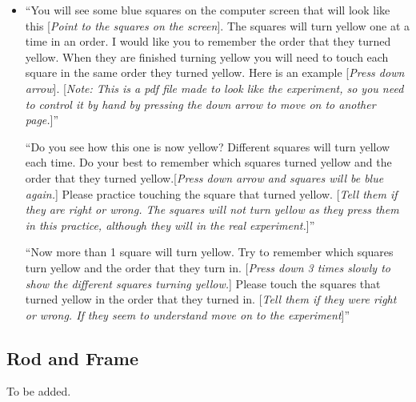 \documentclass{article}
\begin{document}
\begin{itemize}

\item ``You will see some blue squares on the computer screen that will look like this [\emph{Point to the squares on the screen}].  The squares will turn yellow one at a time in an order. I would like you to remember the order that they turned yellow. When they are finished turning yellow you will need to touch each square in the same order they turned yellow. Here is an example [\emph{Press down arrow}]. [\emph{Note: This is a pdf file made to look like the experiment, so you need to control it by hand by pressing the down arrow to move on to another page.}]''

``Do you see how this one is now yellow? Different squares will turn yellow each time.  Do your best to remember which squares turned yellow and the order that they turned yellow.[\emph{Press down arrow and squares will be blue again.}] Please practice touching the square that turned yellow. [\emph{Tell them if they are right or wrong. The squares will not turn yellow as they press them in this practice, although they will in the real experiment.}]''

``Now more than 1 square will turn yellow. Try to remember which squares turn yellow and the order that they turn in. [\emph{Press down 3 times slowly to show the different squares turning yellow.}] Please touch the squares that turned yellow in the order that they turned in. [\emph{Tell them if they were right or wrong. If they seem to understand move on to the experiment}]''

\end{itemize}




\subsection{Rod and Frame}

To be added.

\end{document}
